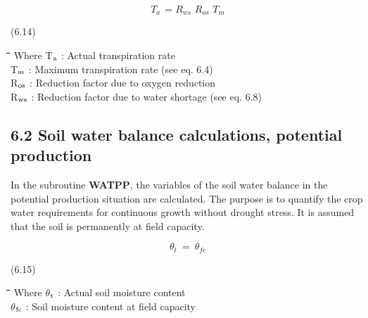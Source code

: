 \documentclass[11pt]{article}
\begin{document}
\begin{displaymath}
T _{a~} =  R _{ws} \,\, R _{os} \,\, T _{m} 
\end{displaymath}

 \bigskip
\strut\hfill (6.14)
\nwln
\begin{tabbing}
\hspace{1.27cm}\=\hspace{1.27cm}\=\hspace{1.27cm}\=\hspace{1.27cm}\=%
\hspace{1.27cm}\=\hspace{1.27cm}\=\hspace{1.27cm}\=\hspace{1.27cm}\=%
\hspace{1.27cm}\=\hspace{1.27cm}\=\kill
Where\> \> T$_{{\rm a}}$\> : Actual transpiration rate\> \> \> \> \> \> \> [cm d$^{{\rm -1}}$]\\
\>\> T$_{{\rm m}}$\> : Maximum transpiration rate (see eq. 6.4)\> \> \> \> \> \> \> [cm d$^{{\rm -1}}$]\\
\>\> R$_{{\rm os}}$\> : Reduction factor due to oxygen reduction\> \> \> \> \> \> \> [-]\\
\>\> R$_{{\rm ws}}$\> : Reduction factor due to water shortage (see eq. 6.8)\> \> \> \> \> \> \> [-]
\end{tabbing}
 
\subsection{  6.2 Soil water balance calculations, potential pro\-duction  }

In the subroutine {\bf WATPP}, the variables of the soil water balance in the potential produc\-tion situation are calculated. The purpose is to quantify the crop water requirements for
continuous growth without drought stress. It is assumed that the soil is permanent\-ly at
field capacity.

\begin{displaymath}
\theta  _{t} ~ =~\theta  _{fc} 
\end{displaymath}

 \bigskip
\strut\hfill (6.15)
\nwln
\begin{tabbing}
\hspace{1.27cm}\=\hspace{1.27cm}\=\hspace{1.27cm}\=\hspace{1.27cm}\=%
\hspace{1.27cm}\=\hspace{1.27cm}\=\hspace{1.27cm}\=\hspace{1.27cm}\=%
\hspace{1.27cm}\=\hspace{1.27cm}\=\kill
Where\> \> $\theta$$_{{\rm t}}$\> : Actual soil moisture content\> \> \> \> \> \> \> [cm$^{{\rm 3}}$ cm$^{{\rm -3}}$]\\
\>\> $\theta$$_{{\rm fc}}$\> : Soil moisture content at field capacity\> \> \> \> \> \> \> [cm$^{{\rm 3}}$ cm$^{{\rm -3}}$]
\end{tabbing}
\end{document}
